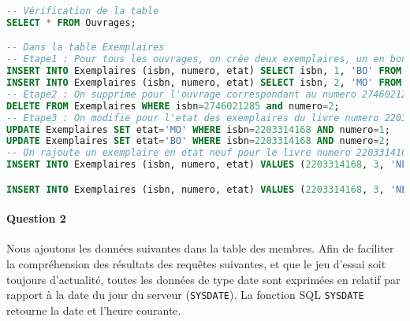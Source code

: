 \documentclass[10pt, oneside]{article}
\begin{document}
\begin{lstlisting}[language=sql, title=Question 1, label=QII1]
-- Vérification de la table
SELECT * FROM Ouvrages;

-- Dans la table Exemplaires
-- Etape1 : Pour tous les ouvrages, on crée deux exemplaires, un en bon etat et un autre en moyen
INSERT INTO Exemplaires (isbn, numero, etat) SELECT isbn, 1, 'BO' FROM Ouvrages;
INSERT INTO Exemplaires (isbn, numero, etat) SELECT isbn, 2, 'MO' FROM Ouvrages;
-- Etape2 : On supprime pour l'ouvrage correspondant au numero 2746021285 l'exemplaire 2 car on ne dispose que d'un seul exemplaire pour cet ouvrage
DELETE FROM Exemplaires WHERE isbn=2746021285 and numero=2;
-- Etape3 : On modifie pour l'etat des exemplaires du livre numero 2203314168 (inversion des etats)
UPDATE Exemplaires SET etat='MO' WHERE isbn=2203314168 AND numero=1;
UPDATE Exemplaires SET etat='BO' WHERE isbn=2203314168 AND numero=2;
-- On rajoute un exemplaire en etat neuf pour le livre numero 2203314168
INSERT INTO Exemplaires (isbn, numero, etat) VALUES (2203314168, 3, 'NE');

INSERT INTO Exemplaires (isbn, numero, etat) VALUES (2203314168, 3, 'NE');
\end{lstlisting}


\paragraph{Question 2} Nous ajoutons les données suivantes dans la table des membres. Afin de faciliter la compréhension des résultats des requêtes suivantes, et que le jeu d'essai soit toujours d'actualité, toutes les données de type date sont exprimées en relatif par rapport à la date du jour du serveur (\texttt{SYSDATE}). La fonction SQL \texttt{SYSDATE} retourne la date et l'heure courante.
\end{document}
